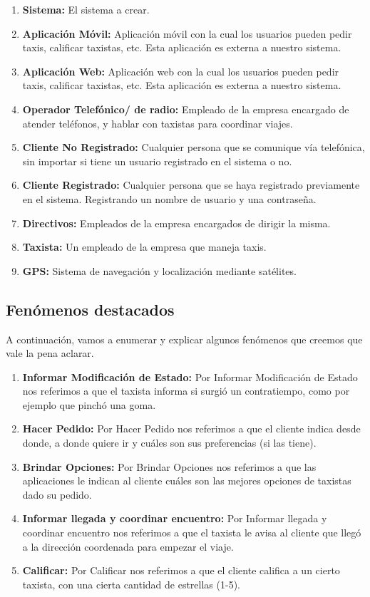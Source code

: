 \documentclass[a4paper, 10pt, twoside]{article}
\begin{document}
  \begin{enumerate}
    \item \textbf{Sistema:} El sistema a crear.
    \item \textbf{Aplicación Móvil:} Aplicación móvil con la cual los usuarios pueden pedir taxis, calificar taxistas, etc. Esta aplicación es externa a nuestro sistema.
    \item \textbf{Aplicación Web:} Aplicación web con la cual los usuarios pueden pedir taxis, calificar taxistas, etc. Esta aplicación es externa a nuestro sistema.
    \item \textbf{Operador Telefónico/ de radio:} Empleado de la empresa encargado de atender teléfonos, y hablar con taxistas para coordinar viajes.
    \item \textbf{Cliente No Registrado:} Cualquier persona que se comunique vía telefónica, sin importar si tiene un usuario registrado en el sistema o no.
    \item \textbf{Cliente Registrado:} Cualquier persona que se haya registrado previamente en el sistema. Registrando un nombre de usuario y una contraseña.
    \item \textbf{Directivos:} Empleados de la empresa encargados de dirigir la misma.
    \item \textbf{Taxista:} Un empleado de la empresa que maneja taxis.
    \item \textbf{GPS:} Sistema de navegación y localización mediante satélites.
  \end{enumerate}

\subsection{Fenómenos destacados}

A continuación, vamos a enumerar y explicar algunos fenómenos que creemos que vale la pena aclarar.

   \begin{enumerate}
     \item \textbf{Informar Modificación de Estado:} Por Informar Modificación de Estado nos referimos a que el taxista informa si surgió un contratiempo, como por ejemplo que pinchó una goma.
     \item \textbf{Hacer Pedido:} Por Hacer Pedido nos referimos a que el cliente indica desde donde, a donde quiere ir y cuáles son sus preferencias (si las tiene).
     \item \textbf{Brindar Opciones:} Por Brindar Opciones nos referimos a que las aplicaciones le indican al cliente cuáles son las mejores opciones de taxistas dado su pedido.
     \item \textbf{Informar llegada y coordinar encuentro:} Por Informar llegada y coordinar encuentro nos referimos a que el taxista le avisa al cliente que llegó a la dirección coordenada para empezar el viaje.
     \item \textbf{Calificar:} Por Calificar nos referimos a que el cliente califica a un cierto taxista, con una cierta cantidad de estrellas (1-5).
  \end{enumerate}
 
\end{document}
